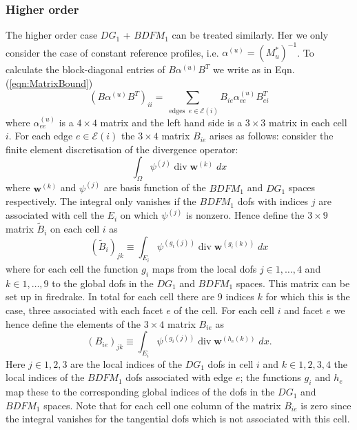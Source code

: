 \documentclass[12pt]{article}
\renewcommand{\vec}[1]{\boldsymbol{#1}}
\begin{document}
\subsubsection{Higher order}
The higher order case $DG_1$ + $BDFM_1$ can be treated similarly. Her we only consider the case of constant reference profiles, i.e. $\alpha^{(u)}=\left(M_u^*\right)^{-1}$.
To calculate the block-diagonal entries of $B\alpha^{(u)}B^T$ we write as in Eqn. (\ref{eqn:MatrixBound})
\begin{equation}
(B \alpha^{(u)} B^T)_{ii} = \sum_{\operatorname{edges}\;e\in\mathcal{E}(i)} B_{ie} \alpha^{(u)}_{ee} B^T_{ei}
\label{eqn:MatrixBoundBDFM1}
\end{equation}
where $\alpha^{(u)}_{ee}$ is a $4\times 4$ matrix and the left hand side is a $3\times 3$ matrix in each cell $i$. For each edge $e\in\mathcal{E}(i)$ the $3\times 4$ matrix $B_{ie}$ arises as follows: consider the finite element discretisation of the divergence operator:
\begin{equation}
  \int_{\Omega} \psi^{(j)}\operatorname{div}\vec{w}^{(k)}\; dx
\end{equation}
where $\vec{w}^{(k)}$ and $\psi^{(j)}$ are basis function of the $BDFM_1$ and $DG_1$ spaces respectively. The integral only vanishes if the $BDFM_1$ dofs with indices $j$ are associated with cell the $E_i$ on which $\psi^{(j)}$ is nonzero. Hence define the $3\times 9$ matrix $\tilde{B}_i$ on each cell $i$ as
\begin{equation}
  \left(\tilde{B}_i\right)_{jk} \equiv \int_{E_i} \psi^{(g_i(j))}\operatorname{div}\vec{w}^{(g_i(k))}\; dx
\end{equation}
where for each cell the function $g_i$ maps from the local dofs $j\in1,\dots,4$ and $k\in1,\dots,9$ to the global dofs in the $DG_1$ and $BDFM_1$ spaces. This matrix can be set up in firedrake.
In total for each cell there are 9 indices $k$ for which this is the case, three associated with each facet $e$ of the cell. For each cell $i$ and facet $e$ we hence define the elements of the $3\times 4$ matrix $B_{ie}$ as
\begin{equation}
  (B_{ie})_{jk} \equiv \int_{E_i} \psi^{(g_i(j))} \operatorname{div}\vec{w}^{(h_e(k))}\; dx.
\end{equation}
Here $j\in1,2,3$ are the local indices of the $DG_1$ dofs in cell $i$ and $k\in1,2,3,4$ the local indices of the $BDFM_1$ dofs associated with edge $e$; the functions $g_i$ and $h_e$ map these to the corresponding global indices of the dofs in the $DG_1$ and $BDFM_1$ spaces. Note that for each cell one column of the matrix $B_{ie}$ is zero since the integral vanishes for the tangential dofs which is not associated with  this cell.
\end{document}
